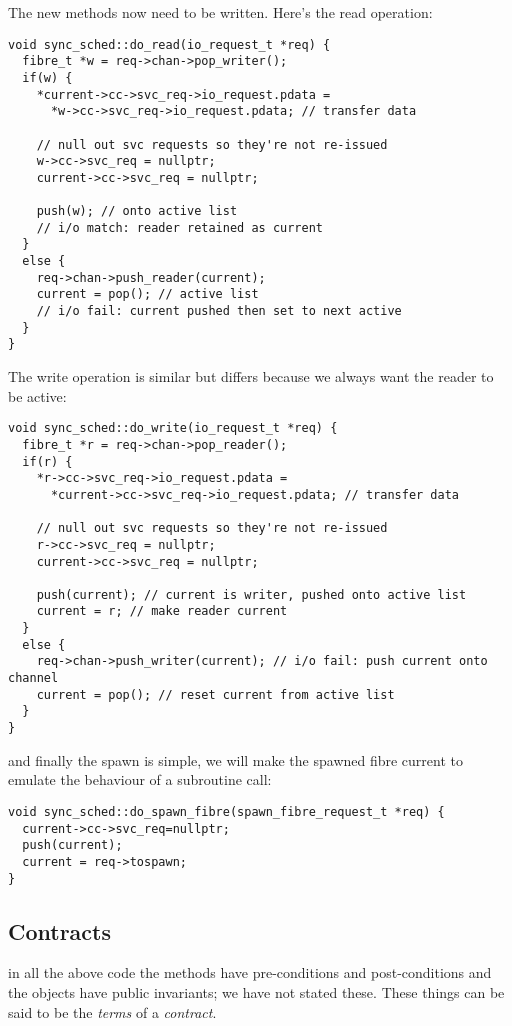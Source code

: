 \documentclass[oneside]{book}
\begin{document}
The new methods now need to be written. Here's the read operation:

\begin{verbatim}
void sync_sched::do_read(io_request_t *req) {
  fibre_t *w = req->chan->pop_writer();
  if(w) {
    *current->cc->svc_req->io_request.pdata =
      *w->cc->svc_req->io_request.pdata; // transfer data

    // null out svc requests so they're not re-issued
    w->cc->svc_req = nullptr;
    current->cc->svc_req = nullptr;

    push(w); // onto active list
    // i/o match: reader retained as current
  }
  else {
    req->chan->push_reader(current);
    current = pop(); // active list
    // i/o fail: current pushed then set to next active
  }
}

\end{verbatim}

The write operation is similar but differs because we always
want the reader to be active:

\begin{verbatim}
void sync_sched::do_write(io_request_t *req) {
  fibre_t *r = req->chan->pop_reader();
  if(r) {
    *r->cc->svc_req->io_request.pdata = 
      *current->cc->svc_req->io_request.pdata; // transfer data

    // null out svc requests so they're not re-issued
    r->cc->svc_req = nullptr;
    current->cc->svc_req = nullptr;

    push(current); // current is writer, pushed onto active list
    current = r; // make reader current
  }
  else {
    req->chan->push_writer(current); // i/o fail: push current onto channel
    current = pop(); // reset current from active list
  }
}

\end{verbatim}

and finally the spawn is simple, we will make the spawned fibre
current to emulate the behaviour of a subroutine call:

\begin{verbatim}
void sync_sched::do_spawn_fibre(spawn_fibre_request_t *req) {
  current->cc->svc_req=nullptr;
  push(current);
  current = req->tospawn;
}
\end{verbatim}

\subsection{Contracts}
in all the above code the methods have pre-conditions and post-conditions
and the objects have public invariants; we have not stated these. These things
can be said to be the {\em terms} of a {\em contract}.
\end{document}
